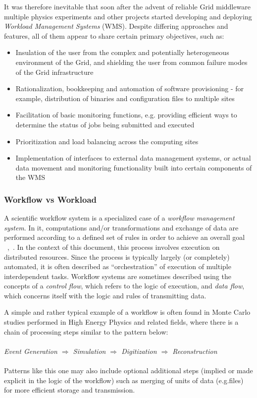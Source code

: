 It was therefore inevitable that soon after the advent of reliable Grid middleware multiple physics experiments and other projects started developing and deploying \textit{Workload Management Systems} (WMS).
Despite differing approaches and features, all of them appear to share certain primary objectives, such as:
\begin{itemize}
\item{Insulation of the user from the complex and potentially heterogeneous environment of the Grid, and shielding the user from common failure modes of the Grid infrastructure}
\item{Rationalization, bookkeeping and automation of software provisioning - for example, distribution of binaries and configuration files to multiple sites}
\item{Facilitation of basic monitoring functions, e.g. providing efficient ways to determine the status of jobs being submitted and executed}
\item{Prioritization and load balancing across the computing sites}
\item{Implementation of interfaces to external data management systems, or actual data movement and monitoring functionality built into certain components of the WMS}
\end{itemize}


\subsubsection{Workflow vs Workload}
\label{workflow_workload}
A scientific workflow system is a specialized case of a \textit{workflow management system}. In it, computations and/or transformations and exchange of data are performed according to a defined set of rules
in order to achieve an overall goal ~\cite{grid_workflow_taxonomy},~\cite{grid_workflow_fit}. In the context of this document, this process involves execution on distributed resources. Since the process is
typically largely (or completely) automated, it is often described as ``orchestration'' of execution of multiple interdependent tasks. Workflow systems are sometimes described using the concepts of a \textit{control flow},
which refers to the logic of execution, and \textit{data flow}, which concerns itself with the logic and rules of transmitting data.

A simple and rather typical example of a workflow is often found in Monte Carlo studies performed in High Energy Physics and related fields, where there is a chain of processing steps similar to the pattern below:
\\
\\
\textit{Event  Generation $\Longrightarrow$ Simulation $\Longrightarrow$ Digitization $\Longrightarrow$ Reconstruction}
\\
\\
Patterns like this one may also include optional additional steps (implied or made explicit in the logic of the workflow) such as merging of units of data (e.g.files) for more efficient storage and transmission.

